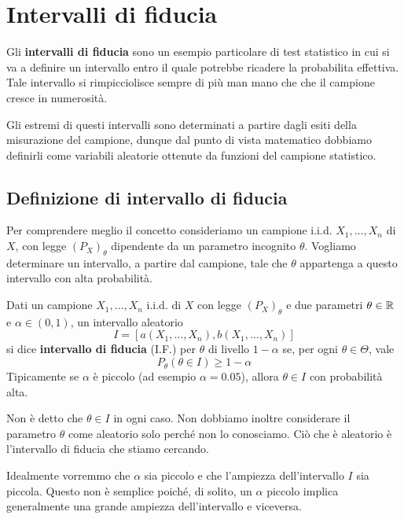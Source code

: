 \chapter{Intervalli di fiducia}
Gli \textbf{intervalli di fiducia} sono un esempio particolare di test statistico in cui si va a
definire un intervallo entro il quale potrebbe ricadere la probabilita effettiva. Tale intervallo
si rimpicciolisce sempre di più man mano che che il campione cresce in numerosità.

Gli estremi di questi intervalli sono determinati a partire dagli esiti della misurazione del
campione, dunque dal punto di vista matematico dobbiamo definirli come variabili aleatorie
ottenute da funzioni del campione statistico.

\section{Definizione di intervallo di fiducia}
Per comprendere meglio il concetto consideriamo un campione i.i.d. $X_1, \dots, X_n$ di $X$, con
legge $(P_X)_\theta$ dipendente da un parametro incognito $\theta$. Vogliamo determinare un
intervallo, a partire dal campione, tale che $\theta$ appartenga a questo intervallo con alta
probabilità.

\begin{definition}
	Dati un campione $X_1, \dots, X_n$ i.i.d. di $X$ con legge $(P_X)_\theta$ e due parametri
	$\theta \in \mathbb{R}$ e $\alpha \in (0,1)$, un intervallo aleatorio
	\[ I = [a(X_1, \dots, X_n), b(X_1, \dots, X_n)] \]
	si dice \textbf{intervallo di fiducia} (I.F.) per $\theta$ di livello $1-\alpha$ se, per ogni
	$\theta \in \Theta$, vale
	\[ P_\theta (\theta \in I) \geq 1 - \alpha \]
	Tipicamente se $\alpha$ è piccolo (ad esempio $\alpha = 0.05$), allora $\theta \in I$ con
	probabilità alta.
\end{definition}

\begin{observation}
	Non è detto che $\theta \in I$ in ogni caso. Non dobbiamo inoltre considerare il parametro
	$\theta$ come aleatorio solo perché non lo conosciamo. Ciò che è aleatorio è l'intervallo di
	fiducia che stiamo cercando.
\end{observation}

Idealmente vorremmo che $\alpha$ sia piccolo e che l'ampiezza dell'intervallo $I$ sia piccola.
Questo non è semplice poiché, di solito, un $\alpha$ piccolo implica generalmente una grande
ampiezza dell'intervallo e viceversa.